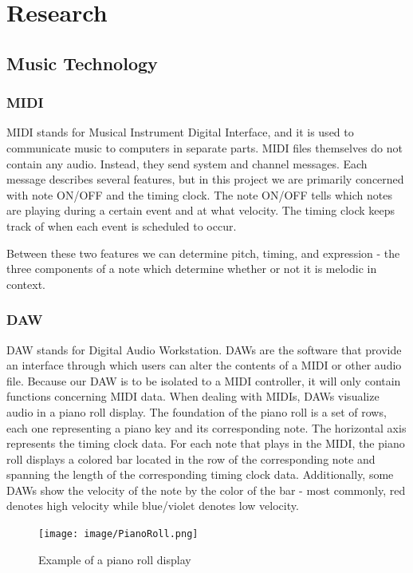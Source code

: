 \section{Research}

\subsection{Music Technology}

\subsubsection{MIDI}

MIDI stands for Musical Instrument Digital Interface, and it is used to communicate music
to computers in separate parts. MIDI files themselves do not contain any audio. Instead,
they send system and channel messages. Each message describes several features, but in
this project we are primarily concerned with note ON/OFF and the timing clock. The note
ON/OFF tells which notes are playing during a certain event and at what velocity. The
timing clock keeps track of when each event is scheduled to occur.

Between these two features we can determine pitch, timing, and expression - the three
components of a note which determine whether or not it is melodic in context.

\subsubsection{DAW}
\label{sec:daw}

DAW stands for Digital Audio Workstation. DAWs are the software that provide an interface
through which users can alter the contents of a MIDI or other audio file. Because our DAW
is to be isolated to a MIDI controller, it  will only contain functions concerning MIDI
data. When dealing with MIDIs, DAWs visualize audio in a piano roll display. The
foundation of the piano roll is a set of rows, each one representing a piano key and its
corresponding note. The horizontal axis represents the timing clock data. For each note
that plays in the MIDI, the piano roll displays a colored bar located in the row of the
corresponding note and spanning the length of the corresponding timing clock data.
Additionally, some DAWs show the velocity of the note by the color of the bar - most
commonly, red denotes high velocity while blue/violet denotes low velocity.

\begin{figure}[h!]
  \centering
  \texttt{[image: image/PianoRoll.png]}
  \caption{Example of a piano roll display}
  \label{fig:piano_roll}
\end{figure}

